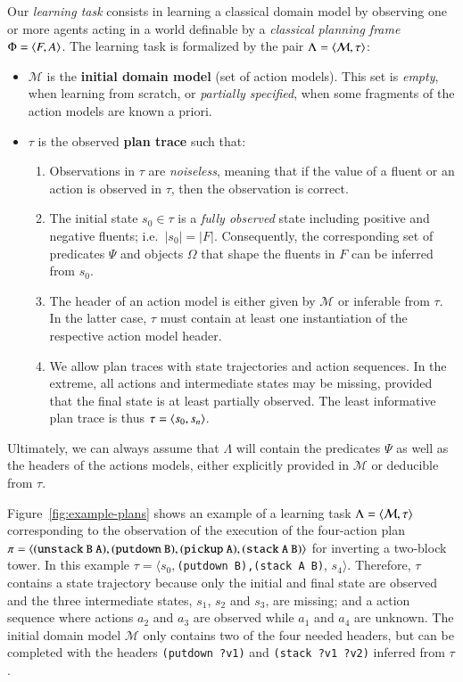 Our {\em learning task} consists in learning a classical domain model by observing one or more agents acting in a world definable by a {\em classical planning frame} $\Phi={\langle F,A \rangle}$. The learning task is formalized by the pair $\Lambda={\langle \mathcal{M},\tau \rangle}$:


\begin{itemize}
\item $\mathcal{M}$ is the {\bf initial domain model} (set of action models). This set is {\em empty}, when learning from scratch, or {\em partially specified}, when some fragments of the action models are known a priori.
\item $\tau$ is the observed {\bf plan trace} such that:
\begin{enumerate}
 \item Observations in $\tau$ are {\em noiseless}, meaning that if the value of a fluent or an action is observed in $\tau$, then the observation is correct.
\item The initial state $s_0\in\tau$ is a {\em fully observed} state including positive and negative fluents; i.e.~$|s_0|=|F|$. Consequently, the corresponding set of predicates $\Psi$ and objects $\Omega$ that shape the fluents in $F$ can be inferred from $s_0$.
\item The header of an action model is either given by $\mathcal{M}$ or inferable from $\tau$. In the latter case, $\tau$ must contain at least one instantiation of the respective action model header.
\item We allow plan traces with \NO state trajectories and \NO action sequences. In the extreme, all actions and intermediate states may be missing, provided that the final state is at least partially observed. The least informative plan trace is thus $\tau = {\langle s_0,s_n \rangle}$.
\end{enumerate}
\end{itemize}

Ultimately, we can always assume that $\Lambda$ will contain the predicates $\Psi$ as well as the headers of the actions models, either explicitly provided in $\mathcal{M}$ or deducible from $\tau$.

\vspace{0.1cm}

Figure~\ref{fig:example-plans} shows an example of a learning task $\Lambda={\langle \mathcal{M},\tau \rangle}$ corresponding to the observation of the execution of the four-action plan $\pi={\langle \small\tt (unstack\ B\ A), (putdown\ B), (pickup\ A), (stack\ A\ B) \rangle}$ for inverting a two-block tower. In this example $\tau=\langle s_0,${\small\tt (putdown\ B),(stack\ A\ B)}, $s_4\rangle$. \textcolor[rgb]{1.00,0.00,0.00}{Therefore, $\tau$ contains a \NO state trajectory because only the initial and final state are observed and the three intermediate states, $s_1$, $s_2$ and $s_3$, are missing; and a \PO action sequence where actions $a_2$ and $a_3$ are observed while $a_1$ and $a_4$ are unknown.} The initial domain model $\mathcal{M}$ only contains two of the four needed headers, but can be completed with the headers {\small\tt(putdown ?v1)} and {\small\tt(stack ?v1 ?v2)} inferred from $\tau$.

